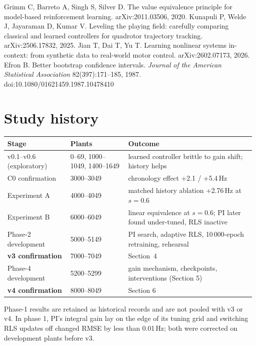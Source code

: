 \documentclass[11pt]{article}
\newcommand{\Hz}{\,Hz}
\begin{document}
\begin{thebibliography}{99}
 Grimm C, Barreto A, Singh S, Silver D. The value equivalence principle for model-based reinforcement learning. arXiv:2011.03506, 2020.
 Kunapuli P, Welde J, Jayaraman D, Kumar V. Leveling the playing field: carefully comparing classical and learned controllers for quadrotor trajectory tracking. arXiv:2506.17832, 2025.
 Jian T, Dai T, Yu T. Learning nonlinear systems in-context: from synthetic data to real-world motor control. arXiv:2602.07173, 2026.
 Efron B. Better bootstrap confidence intervals. \emph{Journal of the American Statistical Association} 82(397):171--185, 1987. doi:10.1080/01621459.1987.10478410
\end{thebibliography}

\appendix
\section{Study history}\label{app:history}
\begin{table}[h]\centering\small
\begin{tabular}{@{}llL{7.6cm}@{}}\toprule
Stage & Plants & Outcome\\\midrule
v0.1--v0.6 (exploratory) & 0--69, 1000--1049, 1400--1649 & learned controller brittle to gain shift; history helps\\
C0 confirmation & 3000--3049 & chronology effect +2.1 / +5.4\Hz\\
Experiment A & 4000--4049 & matched history ablation +2.76\Hz{} at $s=0.6$\\
Experiment B & 6000--6049 & linear equivalence at $s=0.6$; PI later found under-tuned, RLS inactive\\
Phase-2 development & 5000--5149 & PI search, adaptive RLS, 10\,000-epoch retraining, rehearsal\\
\textbf{v3 confirmation} & 7000--7049 & Section~4\\
Phase-4 development & 5200--5299 & gain mechanism, checkpoints, interventions (Section 5)\\
\textbf{v4 confirmation} & 8000--8049 & Section 6\\\bottomrule
\end{tabular}\end{table}
Phase-1 results are retained as historical records and are not pooled with v3 or v4. In phase 1, PI's integral gain lay on the edge of its tuning grid and switching RLS updates off changed RMSE by less than 0.01\Hz; both were corrected on development plants before v3.
\end{document}
